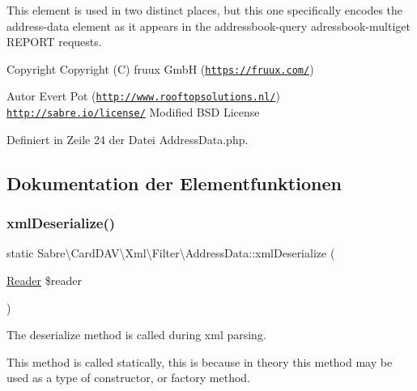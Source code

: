 This element is used in two distinct places, but this one specifically encodes the address-\/data element as it appears in the addressbook-\/query adressbook-\/multiget R\+E\+P\+O\+RT requests.

\begin{DoxyCopyright}{Copyright}
Copyright (C) fruux GmbH (\href{https://fruux.com/}{\tt https\+://fruux.\+com/}) 
\end{DoxyCopyright}
\begin{DoxyAuthor}{Autor}
Evert Pot (\href{http://www.rooftopsolutions.nl/}{\tt http\+://www.\+rooftopsolutions.\+nl/})  \href{http://sabre.io/license/}{\tt http\+://sabre.\+io/license/} Modified B\+SD License 
\end{DoxyAuthor}


Definiert in Zeile 24 der Datei Address\+Data.\+php.



\subsection{Dokumentation der Elementfunktionen}
\mbox{\label{class_sabre_1_1_card_d_a_v_1_1_xml_1_1_filter_1_1_address_data_aa2a94c5daaa13bd6710096bd24fe661e}} 
\subsubsection{\texorpdfstring{xml\+Deserialize()}{xmlDeserialize()}}
{\footnotesize\ttfamily static Sabre\textbackslash{}\+Card\+D\+A\+V\textbackslash{}\+Xml\textbackslash{}\+Filter\textbackslash{}\+Address\+Data\+::xml\+Deserialize (\begin{DoxyParamCaption}\item[{\mbox{\hyperlink{class_sabre_1_1_xml_1_1_reader}{Reader}}}]{\$reader }\end{DoxyParamCaption})\hspace{0.3cm}{\ttfamily [static]}}

The deserialize method is called during xml parsing.

This method is called statically, this is because in theory this method may be used as a type of constructor, or factory method.

